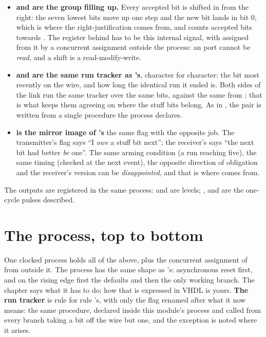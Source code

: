 \begin{itemize}
  \item \textbf{ and  are the group filling up.} Every accepted bit is
    shifted in from the right: the seven lowest bits move up one step and the new bit lands in bit 0,
    which is where the right-justification comes from, and  counts accepted bits
    towards . The register behind  has to be this internal signal, with
     assigned from it by a concurrent assignment outside the process: an  port
    cannot be \emph{read}, and a shift is a read-modify-write.
  \item \textbf{ and  are the same run tracker as 's},
    character for character: the bit most recently on the wire, and how long the identical run it
    ended is. Both sides of the link run the same tracker over the same bits, against the same
     from ; that is what keeps them agreeing on where the stuff bits
    belong. As in , the pair is written from a single procedure the process declares.
  \item \textbf{ is the mirror image of 's
    } \textemdash{} the same flag with the opposite job. The transmitter's flag
    says ``I \emph{owe} a stuff bit next''; the receiver's says ``the next bit had better \emph{be}
    one''. The same arming condition (a run reaching five), the same timing (checked at the next
    event), the opposite direction of obligation \textemdash{} and the receiver's version can be
    \emph{disappointed}, and that is where  comes from.
\end{itemize}

The outputs are registered in the same process:  and  are levels;
,  and  are the one-cycle pulses
 described.

\section{The process, top to bottom}
\label{c15:sec:process}

One clocked process holds all of the above, plus the concurrent assignment of  from
 outside it. The process has the same shape as 's: asynchronous reset
first, and on the rising edge first the defaults and then the only working branch. The chapter says
what it has to do; how that is expressed in VHDL is yours. \textbf{The run tracker} is rule for rule
's, with only the flag renamed after what it now means: the same procedure, declared
inside this module's process and called from every branch taking a bit off the wire but one, and the
exception is noted where it arises.

